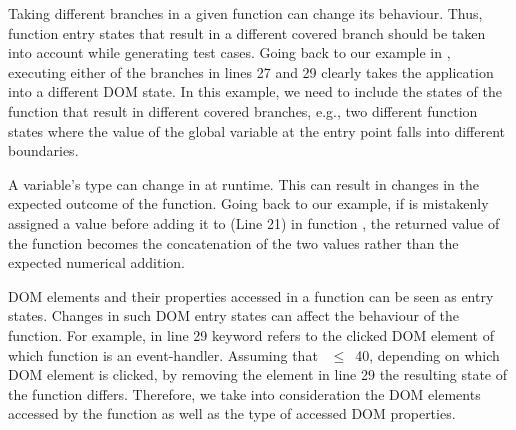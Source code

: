 \begin{description}[leftmargin=0.4cm]
\item[Branch coverage:] Taking different branches in a given function can change its behaviour. Thus, function entry states that result in a different covered branch should be taken into account while generating test cases. Going back to our example in , executing either of the branches in lines 27 and 29 clearly takes the application into a different DOM state. In this example, we need to include the  states of the  function that result in different covered branches, e.g., two different function states where the value of the 
global variable  at the entry point falls into different boundaries.   

\item[Return value type:] A variable's type can change in \javascript at runtime. This can result in changes in the expected outcome of the function. Going back to our example, if  is mistakenly assigned a  value before adding it to  (Line 21) in function , the returned value of the function becomes the  concatenation of the two values rather than the expected numerical addition. 

\item[Accessed DOM properties:] DOM elements and their properties accessed in a function can be seen as entry states. Changes in such DOM entry states can affect the behaviour of the function. For example, in line 29  keyword refers to the clicked DOM element of which function  is an event-handler. Assuming that ~$\leq$~40, depending on which DOM element is clicked, by removing the element in line 29 the resulting state of the function  differs.
Therefore, we take into consideration the DOM elements accessed by the function as well as the type of accessed DOM properties.

\end{description}

